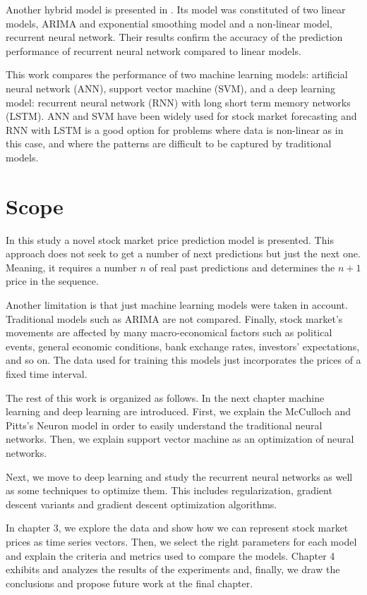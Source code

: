 Another hybrid model is presented in \cite{rather2015recurrent}. Its model was constituted of two linear models,  ARIMA and exponential smoothing model and a non-linear model, recurrent neural network. Their results confirm the accuracy of the prediction performance of recurrent neural network compared to linear models.

This work compares the performance of two machine learning models: artificial neural network (ANN), support vector machine (SVM),  and a deep learning model: recurrent neural network (RNN) with long short term memory networks (LSTM). ANN and SVM have been widely used for stock market forecasting and RNN with LSTM is a good option for problems where data is non-linear  as in this case, and where the patterns are difficult to be captured by traditional models.

\section{Scope}
In this study a novel stock market price prediction model is presented. This approach does not seek to get a number of next predictions but just the next one. Meaning, it requires a number $n$ of real past predictions and determines the $n+1$ price in the sequence. 

Another limitation is that just machine learning models were taken in account. Traditional models such as ARIMA are not compared. Finally, stock market’s movements are affected by many macro-economical factors such as political events, general economic conditions, bank exchange rates, investors’ expectations, and so on. The data used for training this models just incorporates the prices of a fixed time interval.

The rest of this work is organized as follows. In the next chapter machine learning and deep learning are introduced. First, we explain the McCulloch and Pitts's Neuron model in order to easily understand the traditional neural networks. Then, we explain support vector machine as an optimization of neural networks.

Next, we move to deep learning and study the recurrent neural networks as well as some techniques to optimize them. This includes regularization, gradient descent variants and gradient descent optimization algorithms.  

In  chapter 3, we explore the data and show how we can represent stock market prices as time series vectors. Then, we select the right parameters for each model and explain the criteria and metrics used to compare the models. Chapter 4 exhibits and analyzes  the results of the experiments and, finally, we draw the conclusions and propose future work at the final chapter.

